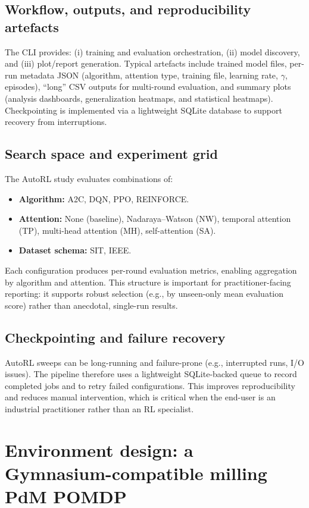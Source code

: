 \documentclass[11pt]{article}
\begin{document}
\subsection{Workflow, outputs, and reproducibility artefacts}
The CLI provides: (i) training and evaluation orchestration, (ii) model discovery, and (iii) plot/report generation. Typical artefacts include trained model files, per-run metadata JSON (algorithm, attention type, training file, learning rate, $\gamma$, episodes), ``long'' CSV outputs for multi-round evaluation, and summary plots (analysis dashboards, generalization heatmaps, and statistical heatmaps). Checkpointing is implemented via a lightweight SQLite database to support recovery from interruptions.

\subsection{Search space and experiment grid}
The AutoRL study evaluates combinations of:
\begin{itemize}
	\item \textbf{Algorithm:} A2C, DQN, PPO, REINFORCE.
	\item \textbf{Attention:} None (baseline), Nadaraya--Watson (NW), temporal attention (TP), multi-head attention (MH), self-attention (SA).
	\item \textbf{Dataset schema:} SIT, IEEE.
\end{itemize}
Each configuration produces per-round evaluation metrics, enabling aggregation by algorithm and attention. This structure is important for practitioner-facing reporting: it supports robust selection (e.g., by unseen-only mean evaluation score) rather than anecdotal, single-run results.

\subsection{Checkpointing and failure recovery}
AutoRL sweeps can be long-running and failure-prone (e.g., interrupted runs, I/O issues). The pipeline therefore uses a lightweight SQLite-backed queue to record completed jobs and to retry failed configurations. This improves reproducibility and reduces manual intervention, which is critical when the end-user is an industrial practitioner rather than an RL specialist.

\section{Environment design: a Gymnasium-compatible milling PdM POMDP}
\label{sec:env}
\end{document}
